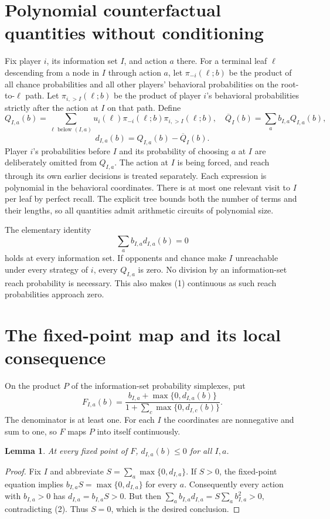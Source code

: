 \documentclass[11pt]{article}
\newtheorem{lemma}{Lemma}
\begin{document}
\section*{Polynomial counterfactual quantities without conditioning}
Fix player $i$, its information set $I$, and action $a$ there. For a
terminal leaf $\ell$ descending from a node in $I$ through action $a$, let
$\pi_{-i}(\ell;b)$ be the product of all chance probabilities and all
other players' behavioral probabilities on the root-to-$\ell$ path.
Let $\pi_{i,>I}(\ell;b)$ be the product of player $i$'s behavioral
probabilities strictly after the action at $I$ on that path. Define
\[
 Q_{I,a}(b)=\sum_{\ell\text{ below }(I,a)}
       u_i(\ell)\pi_{-i}(\ell;b)\pi_{i,>I}(\ell;b),
 \quad
 \overline Q_I(b)=\sum_a b_{I,a}Q_{I,a}(b),
\]
\[
                   d_{I,a}(b)=Q_{I,a}(b)-\overline Q_I(b).          \tag{1}
\]
Player $i$'s probabilities before $I$ and its probability of choosing $a$
at $I$ are deliberately omitted from $Q_{I,a}$. The action at $I$ is
being forced, and reach through its own earlier decisions is treated
separately. Each expression is polynomial in the behavioral coordinates.
There is at most one relevant visit to $I$ per leaf by perfect recall.
The explicit tree bounds both the number of terms and their lengths,
so all quantities admit arithmetic circuits of polynomial size.

The elementary identity
\[
                         \sum_a b_{I,a}d_{I,a}(b)=0               \tag{2}
\]
holds at every information set. If opponents and chance make $I$
unreachable under every strategy of $i$, every $Q_{I,a}$ is zero.
No division by an information-set reach probability is necessary. This
also makes (1) continuous as such reach probabilities approach zero.

\section*{The fixed-point map and its local consequence}
On the product $P$ of the information-set probability simplexes, put
\[
 F_{I,a}(b)=
 \frac{b_{I,a}+\max\{0,d_{I,a}(b)\}}
      {1+\sum_c\max\{0,d_{I,c}(b)\}}.                            \tag{3}
\]
The denominator is at least one. For each $I$ the coordinates are
nonnegative and sum to one, so $F$ maps $P$ into itself continuously.

\begin{lemma}
At every fixed point of $F$, $d_{I,a}(b)\leq0$ for all $I,a$.
\end{lemma}
\begin{proof}
Fix $I$ and abbreviate $S=\sum_a\max\{0,d_{I,a}\}$. If $S>0$, the
fixed-point equation implies $b_{I,a}S=\max\{0,d_{I,a}\}$ for every $a$.
Consequently every action with $b_{I,a}>0$ has
$d_{I,a}=b_{I,a}S>0$. But then
$\sum_a b_{I,a}d_{I,a}=S\sum_a b_{I,a}^2>0$, contradicting (2).
Thus $S=0$, which is the desired conclusion.
\end{proof}
\end{document}
